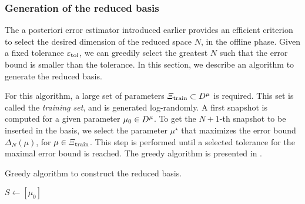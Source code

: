



\subsubsection{Generation of the reduced basis}
\label{sec:generation-reduced-basis}

The a posteriori error estimator introduced earlier provides an efficient criterion to select the desired dimension of the reduced space $N$, in the offline phase.
Given a fixed tolerance $\varepsilon_{\text{tol}}$, we can greedily select the greatest $N$ such that the error bound is smaller than the tolerance.
In this section, we describe an algorithm to generate the reduced basis.

For this algorithm, a large set of parameters $\Xi_{\text{train}}\subset D^{\mu}$ is required.
This set is called the \emph{training set}, and is generated log-randomly.
A first snapshot is computed for a given parameter $\mu_0\in D^{\mu}$.
To get the $N+1$-th snapshot to be inserted in the basis, we select the parameter $\mu^\star$ that maximizes the error bound $\Delta_N(\mu)$, for $\mu\in\Xi_{\text{train}}$.
This step is performed until a selected tolerance for the maximal error bound is reached.
The greedy algorithm is presented in .

\begin{algorithm}
    \caption{Greedy algorithm to construct the reduced basis.}
    \label{algo:Greedy}
    $S\gets [\mu_0]$\;
\end{algorithm}



